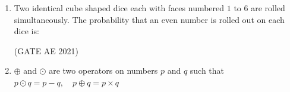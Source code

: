 \documentclass[journal,12pt,onecolumn]{IEEEtran}
\theoremstyle{remark}
\begin{document}
\begin{flushleft}
\begin{enumerate}
\begin{enumerate}
\end{enumerate}
\item 
Two identical cube shaped dice each with faces numbered $1$ to $6$ are rolled simultaneously. The probability that an even number is rolled out on each dice is:

\hfill (GATE AE 2021)
\begin{enumerate}
\end{enumerate}

\item 
$\oplus$ and $\odot$ are two operators on numbers $p$ and $q$ such that \\
$p \odot q = p - q, \quad p \oplus q = p \times q$ \\


\end{enumerate}
\end{flushleft}
\end{document}
